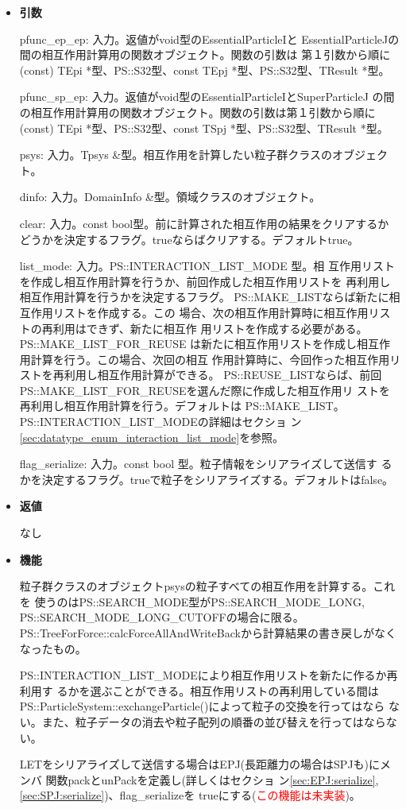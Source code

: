\begin{itemize}

\item {\bf 引数}

pfunc\_ep\_ep: 入力。返値がvoid型のEssentialParticleIと
EssentialParticleJの間の相互作用計算用の関数オブジェクト。関数の引数は
第１引数から順に(const) TEpi *型、PS::S32型、const
TEpj *型、PS::S32型、TResult *型。

pfunc\_sp\_ep: 入力。返値がvoid型のEssentialParticleIとSuperParticleJ
の間の相互作用計算用の関数オブジェクト。関数の引数は第１引数から順に
(const) TEpi *型、PS::S32型、const TSpj *型、PS::S32型、TResult *型。

psys: 入力。Tpsys \&型。相互作用を計算したい粒子群クラスのオブジェクト。

dinfo: 入力。DomainInfo \&型。領域クラスのオブジェクト。

clear: 入力。const bool型。前に計算された相互作用の結果をクリアするか
どうかを決定するフラグ。trueならばクリアする。デフォルトtrue。

list\_mode: 入力。PS::INTERACTION\_LIST\_MODE 型。相
互作用リストを作成し相互作用計算を行うか、前回作成した相互作用リストを
再利用し相互作用計算を行うかを決定するフラグ。
PS::MAKE\_LISTならば新たに相互作用リストを作成する。この
場合、次の相互作用計算時に相互作用リストの再利用はできず、新たに相互作
用リストを作成する必要がある。PS::MAKE\_LIST\_FOR\_REUSE
は新たに相互作用リストを作成し相互作用計算を行う。この場合、次回の相互
作用計算時に、今回作った相互作用リストを再利用し相互作用計算ができる。
PS::REUSE\_LISTならば、前回
PS::MAKE\_LIST\_FOR\_REUSEを選んだ際に作成した相互作用リ
ストを再利用し相互作用計算を行う。デフォルトは
PS::MAKE\_LIST。PS::INTERACTION\_LIST\_MODEの詳細はセクショ
ン\ref{sec:datatype_enum_interaction_list_mode}を参照。

flag\_serialize: 入力。const bool 型。粒子情報をシリアライズして送信す
るかを決定するフラグ。trueで粒子をシリアライズする。デフォルトはfalse。

\item {\bf 返値}

なし

\item {\bf 機能}

粒子群クラスのオブジェクトpsysの粒子すべての相互作用を計算する。これを
使うのはPS::SEARCH\_MODE型がPS::SEARCH\_MODE\_LONG,
PS::SEARCH\_MODE\_LONG\_CUTOFFの場合に限る。
PS::TreeForForce::calcForceAllAndWriteBackから計算結果の書き戻しがなく
なったもの。

PS::INTERACTION\_LIST\_MODEにより相互作用リストを新たに作るか再利用す
るかを選ぶことができる。相互作用リストの再利用している間は
PS::ParticleSystem::exchangeParticle()によって粒子の交換を行ってはなら
ない。また、粒子データの消去や粒子配列の順番の並び替えを行ってはならな
い。

LETをシリアライズして送信する場合はEPJ(長距離力の場合はSPJも)にメンバ
関数packとunPackを定義し(詳しくはセクショ
ン\ref{sec:EPJ:serialize},\ref{sec:SPJ:serialize})、flag\_serializeを
trueにする(\textcolor{red}{この機能は未実装})。

\end{itemize}


